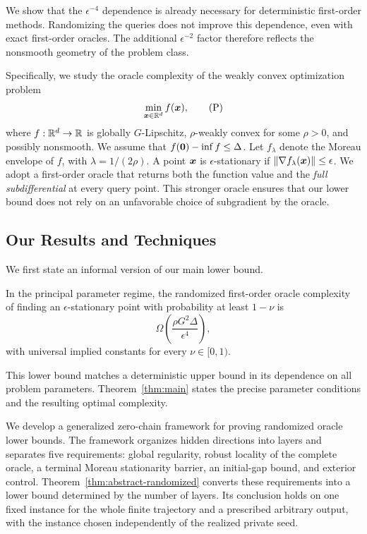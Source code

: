 We show that the $\epsilon^{-4}$ dependence is already necessary
for deterministic first-order methods. Randomizing the queries
does not improve this dependence, even with exact first-order
oracles. The additional $\epsilon^{-2}$ factor therefore reflects
the nonsmooth geometry of the problem class.

Specifically, we study the oracle complexity of the weakly convex
optimization problem
\begin{equation}
\label{eq:prob}
\min_{\bm{x}\in{\mathbb{R}}^d} f(\bm{x}),
\tag{P}
\end{equation}
where $f:{\mathbb{R}}^d\to{\mathbb{R}}$ is globally $G$-Lipschitz,
$\rho$-weakly convex for some $\rho>0$, and possibly nonsmooth.
We assume that $f({\mathbf 0})-\inf f\leq\Delta$.
Let $f_\lambda$ denote the Moreau envelope of $f$, with
$\lambda=1/(2\rho)$. A point $\bm{x}$ is $\epsilon$-stationary if
$\|\nabla f_\lambda(\bm{x})\|\leq\epsilon$.
We adopt a first-order oracle that returns both the function value
and the \emph{full subdifferential} at every query point.
This stronger oracle ensures that our lower bound does not rely
on an unfavorable choice of subgradient by the oracle.

\subsection{Our Results and Techniques}
We first state an informal version of our main lower bound.
\begin{theorem}[Informal]
In the principal parameter regime, the randomized first-order
oracle complexity of finding an $\epsilon$-stationary point with
probability at least $1-\nu$ is
\[
 \Omega\!\left(\frac{\rho G^2\Delta}{\epsilon^4}\right),
\]
with universal implied constants for every $\nu\in[0,1)$.
\end{theorem}
This lower bound matches a deterministic upper bound in its dependence
on all problem parameters. Theorem~\ref{thm:main} states the precise
parameter conditions and the resulting optimal complexity.

We develop a generalized zero-chain framework for proving randomized
oracle lower bounds. The framework organizes hidden directions into
layers and separates five requirements: global regularity, robust
locality of the complete oracle, a terminal Moreau stationarity barrier,
an initial-gap bound, and exterior control. Theorem~\ref{thm:abstract-randomized} converts
these requirements into a lower bound determined by the number of
layers. Its conclusion holds on one fixed instance for the whole finite
trajectory and a prescribed arbitrary output, with the instance chosen
independently of the realized private seed.

